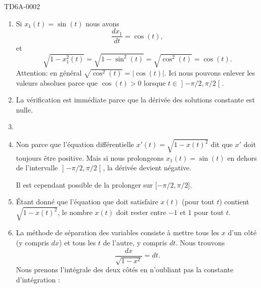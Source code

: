 \begin{corrige}{TD6A-0002}

    \begin{enumerate}
        \item
            Si \( x_1(t)=\sin(t)\) nous avons
            \begin{equation}
                \frac{ dx_1 }{ dt }=\cos(t),
            \end{equation}
            et 
            \begin{equation}
                \sqrt{1-x_1^2(t)}=\sqrt{1-\sin^2(t)}=\sqrt{\cos^2(t)}=\cos(t).
            \end{equation}
            Attention: en général \( \sqrt{\cos^2(t)}=| \cos(t) |\). Ici nous pouvons enlever les valeurs absolues parce que \( \cos(t)>0\) lorsque \( t\in\mathopen] -\pi/2 , \pi/2 \mathclose[\).

        \item

            La vérification est immédiate parce que la dérivée des solutions constante est nulle.

        \item


        \item
            
            Non parce que l'équation différentielle \( x'(t)=\sqrt{1-x(t)^2}\) dit que \( x'\) doit toujours être positive. Mais si nous prolongeons \( x_1(t)=\sin(t)\) en dehors de l'intervalle \( \mathopen] -\pi/2 , \pi/2 \mathclose[\), la dérivée devient négative.

            Il est cependant possible de la prolonger sur \( \mathopen[ -\pi/2 , \pi/2 \mathclose]\).

        \item

            Étant donné que l'équation que doit satisfaire \( x(t)\) (pour tout \( t\)) contient \( \sqrt{1-x(t)^2}\), le nombre \( x(t)\) doit rester entre \( -1\) et \( 1\) pour tout \( t\).

        \item

            La méthode de séparation des variables consiste à mettre tous les \( x\) d'un côté (y compris \( dx\)) et tous les \( t\) de l'autre, y compris \( dt\). Nous trouvons
            \begin{equation}
                \frac{ dx }{ \sqrt{1-x^2} }=dt.
            \end{equation}
            Nous prenons l'intégrale des deux côtés en n'oubliant pas la constante d'intégration :


\end{enumerate}
\end{corrige}

